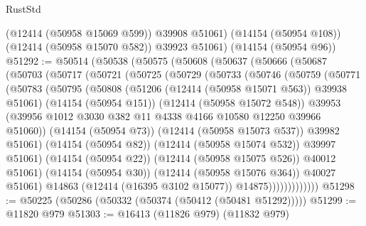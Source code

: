\begin{lexlean}{RustStd}
\begin{coremodule}
        (@12414 (@50958 @15069 @599))
        @39908
        @51061)
      (@14154 (@50954 @108))
      (@12414 (@50958 @15070 @582))
      @39923
      @51061)
    (@14154 (@50954 @96))
@51292 := @50514
    (@50538
      (@50575
        (@50608
          (@50637
            (@50666
              (@50687
                (@50703
                  (@50717
                    (@50721
                      (@50725
                        (@50729
                          (@50733
                            (@50746
                              (@50759
                                (@50771
                                  (@50783
                                    (@50795
                                      (@50808
                                        (@51206 (@12414 (@50958 @15071 @563)) @39938 @51061)
                                        (@14154 (@50954 @151))
                                        (@12414 (@50958 @15072 @548))
                                        @39953
                                        (@39956
                                          @1012
                                          @3030
                                          @382
                                          @11
                                          @4338
                                          @4166
                                          @10580
                                          @12250
                                          @39966
                                          @51060))
                                      (@14154 (@50954 @73))
                                      (@12414 (@50958 @15073 @537))
                                      @39982
                                      @51061)
                                    (@14154 (@50954 @82))
                                    (@12414 (@50958 @15074 @532))
                                    @39997
                                    @51061)
                                  (@14154 (@50954 @22))
                                  (@12414 (@50958 @15075 @526))
                                  @40012
                                  @51061)
                                (@14154 (@50954 @30))
                                (@12414 (@50958 @15076 @364))
                                @40027
                                @51061)
                              @14863
                              (@12414 (@16395 @3102 @15077))
                              @14875)))))))))))))
@51298 := @50225 (@50286 (@50332 (@50374 (@50412 (@50481 @51292)))))
@51299 := @11820 @979
@51303 := @16413 (@11826 @979) (@11832 @979)

\end{coremodule}
\end{lexlean}
